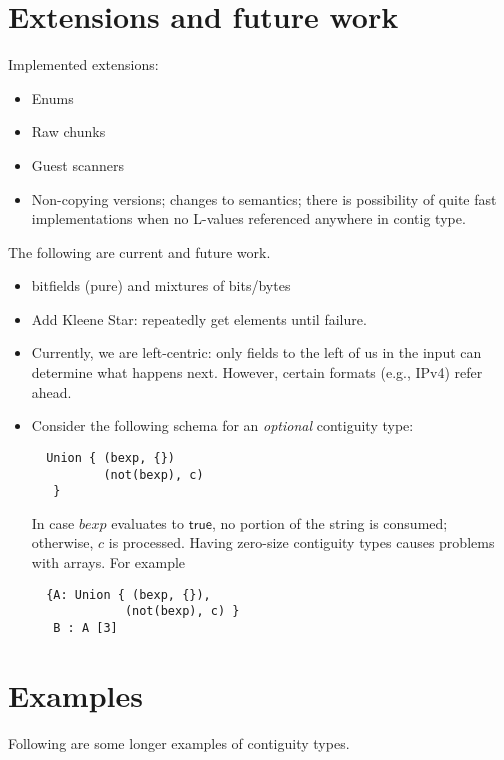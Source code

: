 \documentclass[svgnames]{llncs}
\newcommand{\eg}{e.g.}
\newcommand{\konst}[1]{\ensuremath{\mathsf{#1}}}
\begin{document}
\section{Extensions and future work}

Implemented extensions:

\begin{itemize}
\item Enums
\item Raw chunks
\item Guest scanners
\item Non-copying versions; changes to semantics; there is possibility
  of quite fast implementations when no L-values referenced anywhere
  in contig type.
\end{itemize}

\noindent The following are current and future work.

\begin{itemize}
\item bitfields (pure) and mixtures of bits/bytes
\item Add Kleene Star: repeatedly get elements until failure.
\item Currently, we are left-centric: only fields to the left of us in
  the input can determine what happens next. However, certain formats
  (\eg, IPv4) refer ahead.

\item Consider the following schema for an \emph{optional} contiguity type:

\begin{verbatim}
  Union { (bexp, {})
          (not(bexp), c)
   }
\end{verbatim}

In case $\mathit{bexp}$ evaluates to \konst{true}, no portion of the
string is consumed; otherwise, $c$ is processed. Having zero-size
contiguity types causes problems with arrays. For example

\begin{verbatim}
  {A: Union { (bexp, {}),
             (not(bexp), c) }
   B : A [3]
\end{verbatim}

\end{itemize}


\appendix

\section{Examples}

Following are some longer examples of contiguity types.
\end{document}
